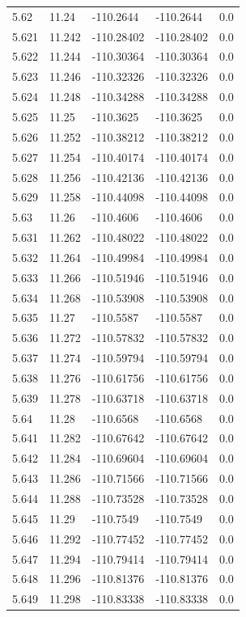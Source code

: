 \begin{tabular}{lllll}
5.62 & 11.24 & -110.2644 & -110.2644 & 0.0 \\
5.621 & 11.242 & -110.28402 & -110.28402 & 0.0 \\
5.622 & 11.244 & -110.30364 & -110.30364 & 0.0 \\
5.623 & 11.246 & -110.32326 & -110.32326 & 0.0 \\
5.624 & 11.248 & -110.34288 & -110.34288 & 0.0 \\
5.625 & 11.25 & -110.3625 & -110.3625 & 0.0 \\
5.626 & 11.252 & -110.38212 & -110.38212 & 0.0 \\
5.627 & 11.254 & -110.40174 & -110.40174 & 0.0 \\
5.628 & 11.256 & -110.42136 & -110.42136 & 0.0 \\
5.629 & 11.258 & -110.44098 & -110.44098 & 0.0 \\
5.63 & 11.26 & -110.4606 & -110.4606 & 0.0 \\
5.631 & 11.262 & -110.48022 & -110.48022 & 0.0 \\
5.632 & 11.264 & -110.49984 & -110.49984 & 0.0 \\
5.633 & 11.266 & -110.51946 & -110.51946 & 0.0 \\
5.634 & 11.268 & -110.53908 & -110.53908 & 0.0 \\
5.635 & 11.27 & -110.5587 & -110.5587 & 0.0 \\
5.636 & 11.272 & -110.57832 & -110.57832 & 0.0 \\
5.637 & 11.274 & -110.59794 & -110.59794 & 0.0 \\
5.638 & 11.276 & -110.61756 & -110.61756 & 0.0 \\
5.639 & 11.278 & -110.63718 & -110.63718 & 0.0 \\
5.64 & 11.28 & -110.6568 & -110.6568 & 0.0 \\
5.641 & 11.282 & -110.67642 & -110.67642 & 0.0 \\
5.642 & 11.284 & -110.69604 & -110.69604 & 0.0 \\
5.643 & 11.286 & -110.71566 & -110.71566 & 0.0 \\
5.644 & 11.288 & -110.73528 & -110.73528 & 0.0 \\
5.645 & 11.29 & -110.7549 & -110.7549 & 0.0 \\
5.646 & 11.292 & -110.77452 & -110.77452 & 0.0 \\
5.647 & 11.294 & -110.79414 & -110.79414 & 0.0 \\
5.648 & 11.296 & -110.81376 & -110.81376 & 0.0 \\
5.649 & 11.298 & -110.83338 & -110.83338 & 0.0 \\

\end{tabular}
